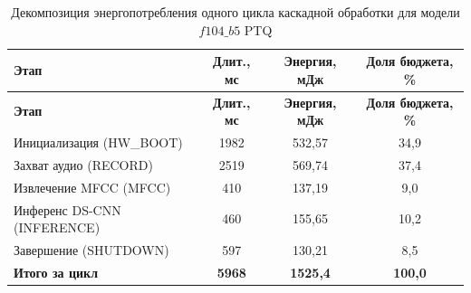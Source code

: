 \begin{longtable}{|p{4.5cm}|c|c|c|}
	\caption{Декомпозиция энергопотребления одного цикла каскадной обработки для модели $f104\_b5$ PTQ}
	\label{tab:energy_decomp}                                                                              \\
	\hline
	\textbf{Этап}                 & \textbf{Длит., мс} & \textbf{Энергия, мДж} & \textbf{Доля бюджета, \%} \\
	\hline
	\endfirsthead
	\hline
	\textbf{Этап}                 & \textbf{Длит., мс} & \textbf{Энергия, мДж} & \textbf{Доля бюджета, \%} \\
	\hline
	\endhead
	\hline
	\endfoot
	Инициализация (HW\_BOOT)      & 1982               & 532,57                & 34,9                      \\ \hline
	Захват аудио (RECORD)         & 2519               & 569,74                & 37,4                      \\ \hline
	Извлечение MFCC (MFCC)        & 410                & 137,19                & 9,0                       \\ \hline
	Инференс DS-CNN (INFERENCE)   & 460                & 155,65                & 10,2                      \\ \hline
	Завершение (SHUTDOWN)         & 597                & 130,21                & 8,5                       \\ \hline
	\textbf{Итого за цикл}        & \textbf{5968}      & \textbf{1525,4}       & \textbf{100,0}            \\
	\hline
\end{longtable}
